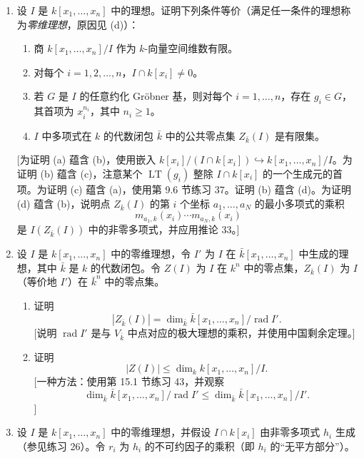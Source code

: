 \begin{enumerate}[label=\arabic*.]
\begin{enumerate}[label=(\alph*)]
		\item 证明 $y(x^2-3y^2+yz)$ 与 $z(x^2-3y^2+yz)$ 属于 $I$，但 $y,z$ 或 $x^2-3y^2+yz$ 中没有一个属于 $I$。
	\end{enumerate}
	\item 设 $I$ 是 $k[x_1,
	\ldots,x_n]$ 中的理想。证明下列条件等价（满足任一条件的理想称为\emph{零维理想}，原因见 (d)）：
	\begin{enumerate}[label=(\alph*)]
		\item 商 $k[x_1,
		\ldots,x_n]/I$ 作为 $k$-向量空间维数有限。
		\item 对每个 $i=1,2,
		\ldots,n$，$I\cap k[x_i]\ne0$。
		\item 若 $G$ 是 $I$ 的任意约化 Gröbner 基，则对每个 $i=1,
		\ldots,n$，存在 $g_i\in G$，其首项为 $x_i^{n_i}$，其中 $n_i\ge1$。
		\item $I$ 中多项式在 $k$ 的代数闭包 $\bar k$ 中的公共零点集 $Z_{\bar k}(I)$ 是有限集。
	\end{enumerate}
	[为证明 (a) 蕴含 (b)，使用嵌入 $k[x_i]/(I\cap k[x_i])\hookrightarrow k[x_1,
	\ldots,x_n]/I$。为证明 (b) 蕴含 (c)，注意某个 $\operatorname{LT}(g_i)$ 整除 $I\cap k[x_i]$ 的一个生成元的首项。为证明 (c) 蕴含 (a)，使用第 9.6 节练习 37。证明 (b) 蕴含 (d)。为证明 (d) 蕴含 (b)，说明点 $Z_{\bar k}(I)$ 的第 $i$ 个坐标 $a_1,
	\ldots,a_N$ 的最小多项式的乘积
	\[
	m_{a_1,k}(x_i)
	\cdots m_{a_N,k}(x_i)
	\]
	是 $I(Z_{\bar k}(I))$ 中的非零多项式，并应用推论 33。]
	\item 设 $I$ 是 $k[x_1,
	\ldots,x_n]$ 中的零维理想，令 $I'$ 为 $I$ 在 $\bar k[x_1,
	\ldots,x_n]$ 中生成的理想，其中 $\bar k$ 是 $k$ 的代数闭包。令 $Z(I)$ 为 $I$ 在 $k^n$ 中的零点集，$Z_{\bar k}(I)$ 为 $I$（等价地 $I'$）在 $\bar k^n$ 中的零点集。
	\begin{enumerate}[label=(\alph*)]
		\item 证明
		\[
		|Z_{\bar k}(I)|=\dim_{\bar k}\bar k[x_1,
		\ldots,x_n]/\operatorname{rad}I'.
		\]
		[说明 $\operatorname{rad}I'$ 是与 $V_{\bar k}$ 中点对应的极大理想的乘积，并使用中国剩余定理。]
		\item 证明
		\[
		|Z(I)|\le \dim_k k[x_1,
		\ldots,x_n]/I.
		\]
		[一种方法：使用第 15.1 节练习 43，并观察
		\[
		\dim_{\bar k}\bar k[x_1,
		\ldots,x_n]/\operatorname{rad}I'\le
		\dim_{\bar k}\bar k[x_1,
		\ldots,x_n]/I'.
		\]]
	\end{enumerate}
	\item 设 $I$ 是 $k[x_1,
	\ldots,x_n]$ 中的零维理想，并假设 $I\cap k[x_i]$ 由非零多项式 $h_i$ 生成（参见练习 26）。令 $r_i$ 为 $h_i$ 的不可约因子的乘积（即 $h_i$ 的“无平方部分”）。
	\begin{enumerate}[label=(\alph*)]

\end{enumerate}
\end{enumerate}
